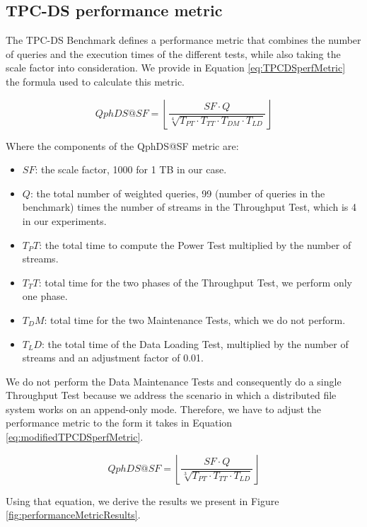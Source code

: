\subsection{TPC-DS performance metric}\label{resultsSummaryPerformanceMetric}

The TPC-DS Benchmark defines a performance metric that combines the number of queries and the execution times of the different tests, while also taking the scale factor into consideration. We provide in Equation \ref{eq:TPCDSperfMetric} the formula used to calculate this metric.

\begin{equation}\label{eq:TPCDSperfMetric}
  QphDS@SF = \left\lfloor\frac{SF \cdot Q}{\sqrt[4]{T_{PT} \cdot T_{TT} \cdot T_{DM} \cdot T_{LD}}}\right\rfloor
\end{equation}

Where the components of the QphDS@SF metric are:
\begin{itemize}
\item	$SF$: the scale factor, 1000 for 1 TB in our case.
\item	$Q$: the total number of weighted queries, 99 (number of queries in the benchmark) times the number of streams in the Throughput Test, which is 4 in our experiments.
\item	$T_PT$: the total time to compute the Power Test multiplied by the number of streams.
\item	$T_TT$: total time for the two phases of the Throughput Test, we perform only one phase.
\item	$T_DM$: total time for the two Maintenance Tests, which we do not perform.
\item	$T_LD$: the total time of the Data Loading Test, multiplied by the number of streams and an adjustment factor of 0.01.
\end{itemize}

We do not perform the Data Maintenance Tests and consequently do a single Throughput Test because we address the scenario in which a distributed file system works on an append-only mode. Therefore, we have to adjust the performance metric to the form it takes in Equation \ref{eq:modifiedTPCDSperfMetric}.

\begin{equation}\label{eq:modifiedTPCDSperfMetric}
  QphDS@SF = \left\lfloor\frac{SF \cdot Q}{\sqrt[3]{T_{PT} \cdot T_{TT} \cdot T_{LD}}}\right\rfloor
\end{equation}

Using that equation, we derive the results we present in Figure \ref{fig:performanceMetricResults}.

